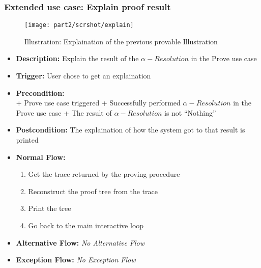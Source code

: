 \documentclass[../gr-final.tex]{subfiles}
\begin{document}
\subsubsection{Extended use case: Explain proof result}
\begin{figure}[H]
  \centering
  \texttt{[image: part2/scrshot/explain]}
  \caption{Illustration: Explaination of the previous provable
  Illustration}
\end{figure}
\begin{itemize}
  \item {\bfseries Description:} Explain the result of the
    $\alpha-Resolution$ in the Prove use case
  \item {\bfseries Trigger:} User chose to get an explaination
  \item {\bfseries Precondition:}\\
    \indent + Prove use case triggered
    \indent + Successfully performed $\alpha-Resolution$ in the
    Prove use case    
    \indent + The result of $\alpha-Resolution$ is not
    ``Nothing''
  \item {\bfseries Postcondition:} The explaination of how the
    system got to that result is printed
  \item {\bfseries Normal Flow:}
    \begin{enumerate}
      \item Get the trace returned by the proving
        procedure        
      \item Reconstruct the proof tree from the trace
      \item Print the tree
      \item Go back to the main interactive loop  
    \end{enumerate}
  \item {\bfseries Alternative Flow:} {\em No Alternative Flow}
  \item {\bfseries Exception Flow:} {\em No Exception Flow}
\end{itemize}
\end{document}
